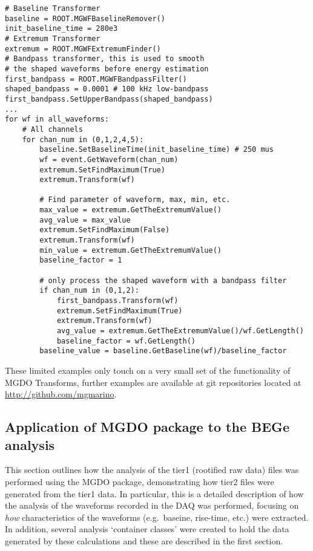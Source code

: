 	\lstset{
	   language=Python}			
			\begin{lstlisting}[caption=Calculating general waveform characteristics in Python]			
# Baseline Transformer
baseline = ROOT.MGWFBaselineRemover()
init_baseline_time = 280e3
# Extremum Transformer
extremum = ROOT.MGWFExtremumFinder()
# Bandpass transformer, this is used to smooth
# the shaped waveforms before energy estimation 
first_bandpass = ROOT.MGWFBandpassFilter()
shaped_bandpass = 0.0001 # 100 kHz low-bandpass
first_bandpass.SetUpperBandpass(shaped_bandpass)
...
for wf in all_waveforms:
    # All channels
    for chan_num in (0,1,2,4,5):
        baseline.SetBaselineTime(init_baseline_time) # 250 mus
        wf = event.GetWaveform(chan_num)
        extremum.SetFindMaximum(True)
        extremum.Transform(wf)

        # Find parameter of waveform, max, min, etc.
        max_value = extremum.GetTheExtremumValue()
        avg_value = max_value
        extremum.SetFindMaximum(False)
        extremum.Transform(wf)
        min_value = extremum.GetTheExtremumValue()
        baseline_factor = 1

        # only process the shaped waveform with a bandpass filter
        if chan_num in (0,1,2):
            first_bandpass.Transform(wf)
            extremum.SetFindMaximum(True)
            extremum.Transform(wf)
            avg_value = extremum.GetTheExtremumValue()/wf.GetLength()
            baseline_factor = wf.GetLength()
        baseline_value = baseline.GetBaseline(wf)/baseline_factor
			\end{lstlisting}	

These limited examples only touch on a very small set of the functionality of MGDO Transforms, further examples are available at git repositories located at \url{http://github.com/mgmarino}.
	
		\subsection{Application of MGDO package to the BEGe analysis}
		
This section outlines how the analysis of the tier1 (rootified raw data) files was performed using the MGDO package, demonstrating how tier2 files were generated from the tier1 data.  In particular, this is a detailed description of how the analysis of the waveforms recorded in the DAQ was performed, focusing on \emph{how} characteristics of the waveforms (e.g.~baseine, rise-time, etc.) were extracted.  In addition, several analysis `container classes' were created to hold the data generated by these calculations and these are described in the first section.  
